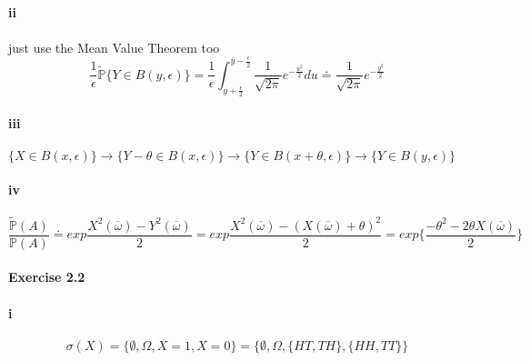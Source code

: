\documentclass{article}
\begin{document}
{\paragraph{ii}
\paragraph{}{just use the Mean Value Theorem too}
\begin{displaymath}
  \frac{1}{\epsilon}\tilde{\mathbb{P}}\{Y\in B(y,\epsilon)\}=\frac{1}{\epsilon}\int_{y+\frac{\epsilon }{2}}^{y-\frac{\epsilon}{2}}\frac{1}{\sqrt{2\pi}}e^{-\frac{u^{2}}{2}}du\doteq\frac{1}{\sqrt{2\pi}}e^{-\frac{y^{2}}{2}}
\end{displaymath}
\paragraph{iii}
\paragraph{}{$\{X\in B(x,\epsilon)\}\rightarrow\{Y-\theta\in B(x,\epsilon)\}\rightarrow\{Y\in B(x+\theta,\epsilon)\}\rightarrow\{Y\in B(y,\epsilon)\}$}
\paragraph{iv}
\begin{displaymath}
\frac{\tilde{\mathbb{P}}(A)}{\mathbb{P}(A)}\doteq exp{\frac{X^{2}(\overline{\omega})-Y^{2}(\overline{\omega})}{2}}=
exp\frac{X^{2}(\overline{\omega})-(X(\overline{\omega})+\theta)^{2}}{2}
=
 exp\{\frac{-\theta^{2}-2\theta X(\overline{\omega})}{2}\}
\end{displaymath}
\paragraph{}{ }

\paragraph{}{ }
\paragraph{}{ }
\paragraph{Exercise 2.2}{}
\paragraph{i}{}
\begin{displaymath}
\sigma(X)=\{\emptyset,\Omega,X=1,X=0\}=\{\emptyset,\Omega,\{HT,TH\},\{HH,TT\}\}
\end{displaymath}
}
\end{document}
